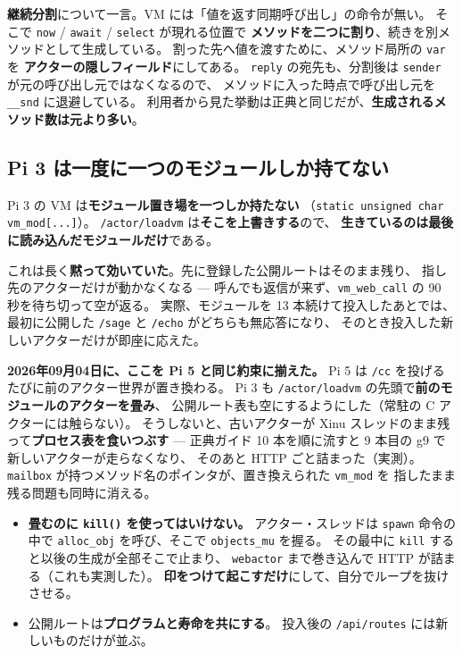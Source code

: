 \documentclass[11pt,a4paper]{ltjsarticle}
\begin{document}
\textbf{継続分割}について一言。VM には「値を返す同期呼び出し」の命令が無い。
そこで \texttt{now} / \texttt{await} / \texttt{select} が現れる位置で
\textbf{メソッドを二つに割り}、続きを別メソッドとして生成している。
割った先へ値を渡すために、メソッド局所の \texttt{var} を
\textbf{アクターの隠しフィールド}にしてある。
\texttt{reply} の宛先も、分割後は \texttt{sender} が元の呼び出し元ではなくなるので、
メソッドに入った時点で呼び出し元を \texttt{\_\_snd} に退避している。
利用者から見た挙動は正典と同じだが、\textbf{生成されるメソッド数は元より多い}。

\subsection{Pi 3 は一度に一つのモジュールしか持てない}
\label{sec:pi3-onemodule}

Pi 3 の VM は\textbf{モジュール置き場を一つしか持たない}
（\texttt{static unsigned char vm\_mod[...]}）。
\texttt{/actor/loadvm} は\textbf{そこを上書きする}ので、
\textbf{生きているのは最後に読み込んだモジュールだけ}である。

これは長く\textbf{黙って効いていた}。先に登録した公開ルートはそのまま残り、
指し先のアクターだけが動かなくなる ---
呼んでも返信が来ず、\texttt{vm\_web\_call} の 90 秒を待ち切って空が返る。
実際、モジュールを 13 本続けて投入したあとでは、
最初に公開した \texttt{/sage} と \texttt{/echo} がどちらも無応答になり、
そのとき投入した新しいアクターだけが即座に応えた。

\textbf{2026年09月04日に、ここを Pi 5 と同じ約束に揃えた。}
Pi 5 は \texttt{/cc} を投げるたびに前のアクター世界が置き換わる。
Pi 3 も \texttt{/actor/loadvm} の先頭で\textbf{前のモジュールのアクターを畳み}、
公開ルート表も空にするようにした（常駐の C アクターには触らない）。
そうしないと、古いアクターが Xinu スレッドのまま残って\textbf{プロセス表を食いつぶす} ---
正典ガイド 10 本を順に流すと 9 本目の g9 で新しいアクターが走らなくなり、
そのあと HTTP ごと詰まった（実測）。
\texttt{mailbox} が持つメソッド名のポインタが、置き換えられた \texttt{vm\_mod} を
指したまま残る問題も同時に消える。

\begin{itemize}
\item \textbf{畳むのに \texttt{kill()} を使ってはいけない。} アクター・スレッドは
  \texttt{spawn} 命令の中で \texttt{alloc\_obj} を呼び、そこで \texttt{objects\_mu} を握る。
  その最中に \texttt{kill} すると以後の生成が全部そこで止まり、
  \texttt{webactor} まで巻き込んで HTTP が詰まる（これも実測した）。
  \textbf{印をつけて起こすだけ}にして、自分でループを抜けさせる。
\item 公開ルートは\textbf{プログラムと寿命を共にする}。
  投入後の \texttt{/api/routes} には新しいものだけが並ぶ。
\end{itemize}
\end{document}
